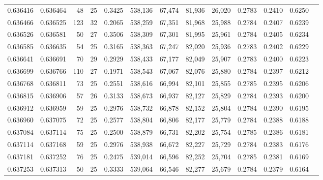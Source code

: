 \begin{tabular}{rrrrrrrrrrrrr}
0.636416 & 0.636464 &  48 &  25 &                                     0.3425 & 538,136 &  67,474 &  81,936 &  26,020 & 0.2783 & 0.2410 & 0.6250 \\
0.636466 & 0.636525 & 123 &  32 &                                     0.2065 & 538,259 &  67,351 &  81,968 &  25,988 & 0.2784 & 0.2407 & 0.6239 \\
0.636526 & 0.636581 &  50 &  27 &                                     0.3506 & 538,309 &  67,301 &  81,995 &  25,961 & 0.2784 & 0.2405 & 0.6234 \\
0.636585 & 0.636635 &  54 &  25 &                                     0.3165 & 538,363 &  67,247 &  82,020 &  25,936 & 0.2783 & 0.2402 & 0.6229 \\
0.636641 & 0.636691 &  70 &  29 &                                     0.2929 & 538,433 &  67,177 &  82,049 &  25,907 & 0.2783 & 0.2400 & 0.6223 \\
0.636699 & 0.636766 & 110 &  27 &                                     0.1971 & 538,543 &  67,067 &  82,076 &  25,880 & 0.2784 & 0.2397 & 0.6212 \\
0.636768 & 0.636811 &  73 &  25 &                                     0.2551 & 538,616 &  66,994 &  82,101 &  25,855 & 0.2785 & 0.2395 & 0.6206 \\
0.636815 & 0.636906 &  57 &  26 &                                     0.3133 & 538,673 &  66,937 &  82,127 &  25,829 & 0.2784 & 0.2393 & 0.6200 \\
0.636912 & 0.636959 &  59 &  25 &                                     0.2976 & 538,732 &  66,878 &  82,152 &  25,804 & 0.2784 & 0.2390 & 0.6195 \\
0.636960 & 0.637075 &  72 &  25 &                                     0.2577 & 538,804 &  66,806 &  82,177 &  25,779 & 0.2784 & 0.2388 & 0.6188 \\
0.637084 & 0.637114 &  75 &  25 &                                     0.2500 & 538,879 &  66,731 &  82,202 &  25,754 & 0.2785 & 0.2386 & 0.6181 \\
0.637114 & 0.637168 &  59 &  25 &                                     0.2976 & 538,938 &  66,672 &  82,227 &  25,729 & 0.2784 & 0.2383 & 0.6176 \\
0.637181 & 0.637252 &  76 &  25 &                                     0.2475 & 539,014 &  66,596 &  82,252 &  25,704 & 0.2785 & 0.2381 & 0.6169 \\
0.637253 & 0.637313 &  50 &  25 &                                     0.3333 & 539,064 &  66,546 &  82,277 &  25,679 & 0.2784 & 0.2379 & 0.6164 \\

\end{tabular}
